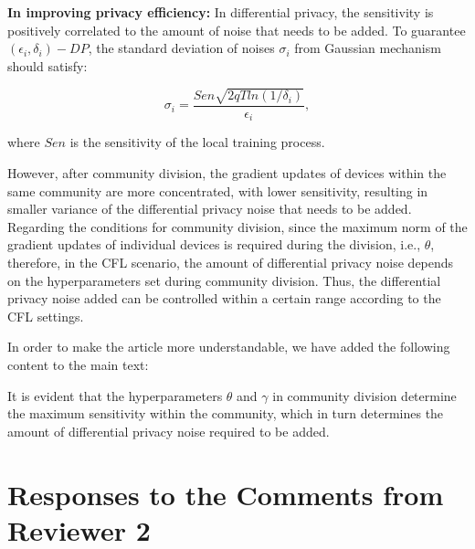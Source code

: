 \documentclass[a4paper,twoside,11pt,dvipsnames]{reviewresponse}
\begin{document}
\textbf{In improving privacy efficiency:} In differential privacy, the sensitivity is positively correlated to the amount of noise that needs to be added. To guarantee $(\epsilon_i,\delta_i)-DP$, the standard deviation of noises $\sigma_i$ from Gaussian mechanism should satisfy:



\begin{equation}
    \sigma_i = \frac{Sen\sqrt{2qTln(1/\delta_i)}}{\epsilon_i},
\end{equation}

where $Sen$ is the sensitivity of the local training process.

However, after community division, the gradient updates of devices within the same community are more concentrated, with lower sensitivity, resulting in smaller variance of the differential privacy noise that needs to be added. Regarding the conditions for community division, since the maximum norm of the gradient updates of individual devices is required during the division, i.e., $\theta$, therefore, in the CFL scenario, the amount of differential privacy noise depends on the hyperparameters set during community division. Thus, the differential privacy noise added can be controlled within a certain range according to the CFL settings.

In order to make the article more understandable, we have added the following content to the main text:


\color{blue}
It is evident that the hyperparameters $\theta$ and $\gamma$ in community division determine the maximum sensitivity within the community, which in turn determines the amount of differential privacy noise required to be added. 
\color{black}

\newpage
\section{Responses to the Comments from Reviewer 2}



\end{document}
